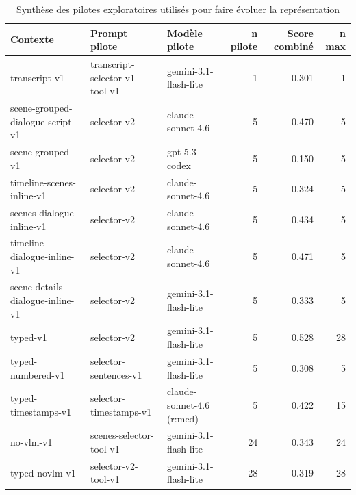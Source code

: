 \begin{table}[ht]
\centering
\footnotesize
\caption{Synth\`ese des pilotes exploratoires utilis\'es pour faire \'evoluer la repr\'esentation}
\label{tab:exploratory-context-runs}
\begin{tabularx}{\textwidth}{>{\raggedright\arraybackslash}p{}>{\raggedright\arraybackslash}p{}>{\raggedright\arraybackslash}Xrrr}
\toprule
Contexte & Prompt pilote & Mod\`ele pilote & n pilote & Score combin\'e & n max \\
\midrule
transcript-v1 & transcript-selector-v1-tool-v1 & gemini-3.1-flash-lite & 1 & 0.301 & 1 \\
scene-grouped-dialogue-script-v1 & selector-v2 & claude-sonnet-4.6 & 5 & 0.470 & 5 \\
scene-grouped-v1 & selector-v2 & gpt-5.3-codex & 5 & 0.150 & 5 \\
timeline-scenes-inline-v1 & selector-v2 & claude-sonnet-4.6 & 5 & 0.324 & 5 \\
scenes-dialogue-inline-v1 & selector-v2 & claude-sonnet-4.6 & 5 & 0.434 & 5 \\
timeline-dialogue-inline-v1 & selector-v2 & claude-sonnet-4.6 & 5 & 0.471 & 5 \\
scene-details-dialogue-inline-v1 & selector-v2 & gemini-3.1-flash-lite & 5 & 0.333 & 5 \\
typed-v1 & selector-v2 & gemini-3.1-flash-lite & 5 & 0.528 & 28 \\
typed-numbered-v1 & selector-sentences-v1 & gemini-3.1-flash-lite & 5 & 0.308 & 5 \\
typed-timestamps-v1 & selector-timestamps-v1 & claude-sonnet-4.6 (r:med) & 5 & 0.422 & 15 \\
no-vlm-v1 & scenes-selector-tool-v1 & gemini-3.1-flash-lite & 24 & 0.343 & 24 \\
typed-novlm-v1 & selector-v2-tool-v1 & gemini-3.1-flash-lite & 28 & 0.319 & 28 \\
\bottomrule
\end{tabularx}
\end{table}

